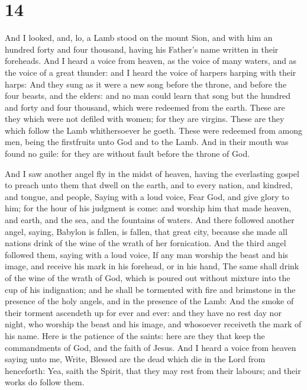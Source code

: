 \hypertarget{section-13}{%
\section{14}\label{section-13}}

 And I looked, and, lo, a Lamb stood on the mount Sion,
and with him an hundred forty and four thousand, having his Father's
name written in their foreheads.  And I heard a voice from
heaven, as the voice of many waters, and as the voice of a great
thunder: and I heard the voice of harpers harping with their harps:
 And they sung as it were a new song before the throne,
and before the four beasts, and the elders: and no man could learn that
song but the hundred and forty and four thousand, which were redeemed
from the earth.  These are they which were not defiled
with women; for they are virgins. These are they which follow the Lamb
whithersoever he goeth. These were redeemed from among men, being the
firstfruits unto God and to the Lamb.  And in their mouth
was found no guile: for they are without fault before the throne of God.

 And I saw another angel fly in the midst of heaven,
having the everlasting gospel to preach unto them that dwell on the
earth, and to every nation, and kindred, and tongue, and people,
 Saying with a loud voice, Fear God, and give glory to
him; for the hour of his judgment is come: and worship him that made
heaven, and earth, and the sea, and the fountains of waters.
 And there followed another angel, saying, Babylon is
fallen, is fallen, that great city, because she made all nations drink
of the wine of the wrath of her fornication.  And the
third angel followed them, saying with a loud voice, If any man worship
the beast and his image, and receive his mark in his forehead, or in his
hand,  The same shall drink of the wine of the wrath of
God, which is poured out without mixture into the cup of his
indignation; and he shall be tormented with fire and brimstone in the
presence of the holy angels, and in the presence of the Lamb:
 And the smoke of their torment ascendeth up for ever and
ever: and they have no rest day nor night, who worship the beast and his
image, and whosoever receiveth the mark of his name. 
Here is the patience of the saints: here are they that keep the
commandments of God, and the faith of Jesus.  And I heard
a voice from heaven saying unto me, Write, Blessed are the dead which
die in the Lord from henceforth: Yea, saith the Spirit, that they may
rest from their labours; and their works do follow them.

